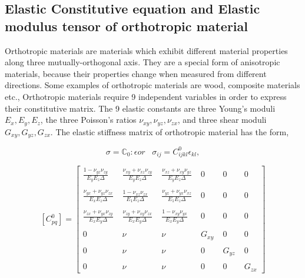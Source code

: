 \documentclass[a4paper,12pt]{extarticle}
\begin{document}
\subsection{Elastic Constitutive equation and Elastic modulus tensor of orthotropic material}\label{Constitutive matrix}
\indent\indent\indent Orthotropic materials are materials which exhibit different material properties along three mutually-orthogonal axis. They are a special form of anisotropic materials, because their properties change when measured from different directions. Some examples of orthotropic materials are wood, composite materials etc., Orthotropic materials require 9 independent variables in order to express their constitutive matrix. The 9 elastic constants are three Young's moduli $E_{x},E_{y},E_{z}$, the three Poisson's ratios $\nu_{xy},\nu_{yz},\nu_{zx}$, and three shear moduli $G_{xy},G_{yz},G_{zx}$. The elastic stiffness matrix of orthotropic material has the form,

\begin{equation}
  \sigma = \mathbb{C}_{0} : \epsilon   or \;\;\;  \sigma_{ij}  =  C^{0}_{ijkl}\epsilon_{kl},
\end{equation}

$$
[C^{0}_{pq}] =  
 \begin{bmatrix}
  \frac{1 - \nu_{yz}\nu_{zy}}{E_{y}E_{z}\Delta} \;& \frac{\nu_{xy} + \nu_{xz}\nu_{zy}}{E_{y}E_{z}\Delta}  \;& \frac{\nu_{xz} + \nu_{xy}\nu_{yz}}{E_{y}E_{z}\Delta}  \;& 0 \;& 0 \;& 0 \\
 \\
   \frac{\nu_{yx} + \nu_{yz}\nu_{zx}}{E_{x}E_{z}\Delta}  \;&  \frac{1 - \nu_{xz}\nu_{zx}}{E_{1}E_{z}\Delta} \; & \frac{\nu_{yz} +\nu_{yx}\nu_{xz}}{E_{1}E_{z}\Delta}  \; & 0\; & 0\; & 0 \\
  \\
    \frac{\nu_{zx} + \nu_{yx}\nu_{zy}}{E_{x}E_{y}\Delta}  \;&   \frac{\nu_{zy} + \nu_{xy}\nu_{zx}}{E_{x}E_{y}\Delta} \;& \frac{1 - \nu_{xy}\nu_{yx}}{E_{x}E_{y}\Delta}  \;& 0 \;& 0 \;& 0 \\ 
\\

 
  0 \;& \nu \;& \nu \;& G_{xy} \;& 0 \;& 0 \\
  \\
  0 \;& \nu \;& \nu \;& 0 \;& G_{yz} \;& 0 \\
  \\
  0\;& \nu \;& \nu \;& 0 \;& 0 \;& G_{zx} 
 \end{bmatrix}
 $$\\
 
\end{document}
